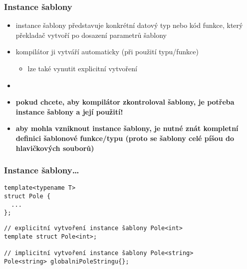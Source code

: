 \begin{frame}[fragile]
\frametitle{Instance šablony}

\begin{block}{}
\begin{itemize}
\item instance šablony představuje konkrétní datový typ nebo kód funkce, který překladač vytvoří po dosazení parametrů šablony
\item kompilátor ji vytváří automaticky (při použití typu/funkce)
\begin{itemize}
\item lze také vynutit explicitní vytvoření
\end{itemize}
\item []
\item \textbf{pokud chcete, aby kompilátor zkontroloval  šablony, je potřeba instance šablony a její použití!}
\item \textbf{aby mohla vzniknout instance šablony, je nutné znát kompletní definici šablonové funkce/typu (proto se šablony celé píšou do hlavičkových souborů)}

\end{itemize}
\end{block}
\end{frame}


\begin{frame}[fragile]
\frametitle{Instance šablony\ldots}
\begin{yesblock}
\begin{lstlisting}
template<typename T> 
struct Pole { 
  ... 
};
\end{lstlisting}
\end{yesblock}

\begin{yesblock}
\begin{lstlisting}
// explicitní vytvoření instance šablony Pole<int>
template struct Pole<int>; 

// implicitní vytvoření instance šablony Pole<string>
Pole<string> globalniPoleStringu{};
\end{lstlisting}
\end{yesblock}
\end{frame}




